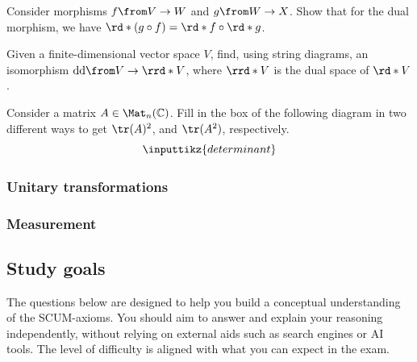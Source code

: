 \documentclass[a4paper,oneside, 12pt]{amsart}
\begin{document}
\begin{exercise}
  Consider morphisms \(f \from V\to W\) and \(g \from W\to X\).
  Show that for the dual morphism, we have
  \(\rd*{(g\circ f)} = \rd*{f} \circ \rd*{g}\).
\end{exercise}

\begin{exercise}
  Given a finite-dimensional vector space \(V\), find, using string diagrams, an isomorphism
  \(\mathrm{dd}\from V \to \rrd*{V}\), where \(\rrd*{V}\) is the dual space of \(\rd*{V}\).
\end{exercise}

\begin{exercise}
  Consider a matrix \(A \in \Mat_{n}( \mathbb{C})\).
  Fill in the box of the following diagram in two different ways to get \(\tr(A)^{2}\), and \(\tr(A^{2})\), respectively.
  \begin{equation*}
    \inputtikz{determinant}
  \end{equation*}
\end{exercise}




\subsubsection*{Unitary transformations}

\subsubsection*{Measurement}


\cleardoublepage
\subsection{Study goals}\label{sec:study-goals}
The questions below are designed to help you build a conceptual understanding of the SCUM-axioms.
You should aim to answer and explain your reasoning independently, without relying on external aids such as search engines or AI tools.
The level of difficulty is aligned with what you can expect in the exam.
\end{document}
